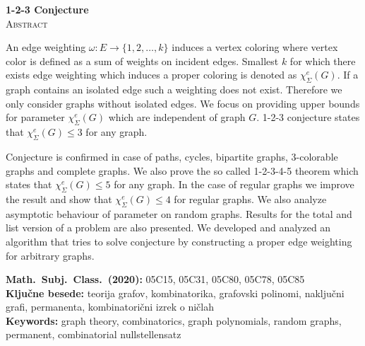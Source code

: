 \documentclass[12pt,a4paper,twoside]{article}
\newcommand{\kljucnebesede}{teorija grafov\sep kombinatorika\sep grafovski polinomi\sep naključni grafi\sep permanenta\sep kombinatorični izrek o ničlah} %
\newcommand{\keywords}{graph theory\sep combinatorics\sep graph polynomials\sep random graphs\sep permanent\sep combinatorial nullstellensatz} %
\newcommand{\sep}{, }  %
\theoremstyle{definition} %
\theoremstyle{plain} %
\newcommand{\ec}{\chi_{\Sigma}^e}
\numberwithin{equation}{section}  %
\begin{document}
\vfill
\begin{center}
\textbf{1-2-3 Conjecture} \\[3mm] %
\textsc{Abstract}\\[2mm]
\end{center}
An edge weighting $\omega : E \rightarrow \{1,2, \ldots, k\}$ induces a vertex coloring where vertex color is defined as a sum of weights on incident edges. Smallest $k$ for which there exists edge weighting which induces a proper coloring is denoted as $\ec(G)$. If a graph contains an isolated edge such a weighting does not exist. Therefore we only consider graphs without isolated edges. We focus on providing upper bounds for parameter $\ec(G)$ which are independent of graph $G$. 1-2-3 conjecture states that $\ec(G) \le 3$ for any graph.

Conjecture is confirmed in case of paths, cycles, bipartite graphs,  $3$-colorable graphs and complete graphs. We also prove the so called 1-2-3-4-5 theorem which states that $\ec(G) \le 5$ for any graph. In the case of regular graphs we improve the result and show that $\ec(G) \le 4$ for regular graphs. We also analyze asymptotic behaviour of parameter on random graphs. Results for the total and list version of a problem are also presented.
We developed and analyzed an algorithm that tries to solve conjecture by constructing a proper edge weighting for arbitrary graphs.


\vfill\noindent
\textbf{Math.~Subj.~Class.~(2020):} 05C15, 05C31, 05C80, 05C78, 05C85
\ \\[1mm]
\textbf{Ključne besede:} \kljucnebesede \\[1mm]
\textbf{Keywords:} \keywords

\cleardoublepage

\setcounter{page}{1}    %
\end{document}
